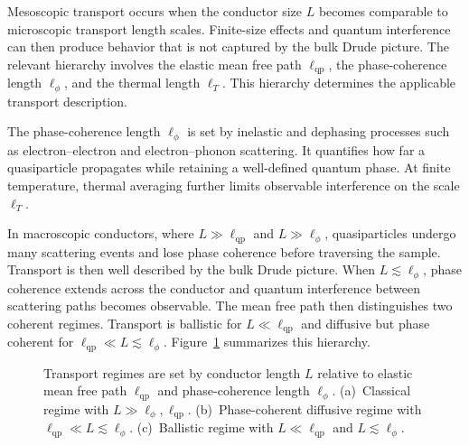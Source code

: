         Mesoscopic transport occurs when the conductor size $L$ becomes comparable to microscopic transport length scales. Finite-size effects and quantum interference can then produce behavior that is not captured by the bulk Drude picture. The relevant hierarchy involves the elastic mean free path $\ell_\mathrm{qp}$, the phase-coherence length $\ell_\phi$, and the thermal length $\ell_T$. This hierarchy determines the applicable transport description.

        The phase-coherence length $\ell_\phi$ is set by inelastic and dephasing processes such as electron--electron and electron--phonon scattering. It quantifies how far a quasiparticle propagates while retaining a well-defined quantum phase. At finite temperature, thermal averaging further limits observable interference on the scale $\ell_T$.

        In macroscopic conductors, where $L \gg \ell_\mathrm{qp}$ and $L \gg \ell_\phi$, quasiparticles undergo many scattering events and lose phase coherence before traversing the sample. Transport is then well described by the bulk Drude picture. When $L \lesssim \ell_\phi$, phase coherence extends across the conductor and quantum interference between scattering paths becomes observable. The mean free path then distinguishes two coherent regimes. Transport is ballistic for $L \ll \ell_\mathrm{qp}$ and diffusive but phase coherent for $\ell_\mathrm{qp} \ll L \lesssim \ell_\phi$. Figure~\ref{fig:basics:meso} summarizes this hierarchy. \cite{ashcroft_solid_2012, gross_festkorperphysik_2014}

        \begin{figure}
            \centering
            \hfill
            \hfill
            \caption{
            Transport regimes are set by conductor length $L$ relative to elastic mean free path $\ell_{\mathrm{qp}}$ and phase-coherence length $\ell_{\phi}$. (a)~Classical regime with $L \gg \ell_{\phi}, \ell_{\mathrm{qp}}$. (b)~Phase-coherent diffusive regime with $\ell_{\mathrm{qp}} \ll L \lesssim \ell_{\phi}$. (c)~Ballistic regime with $L \ll \ell_{\mathrm{qp}}$ and $L \lesssim \ell_{\phi}$.
            }
            \label{fig:basics:meso}
        \end{figure}

